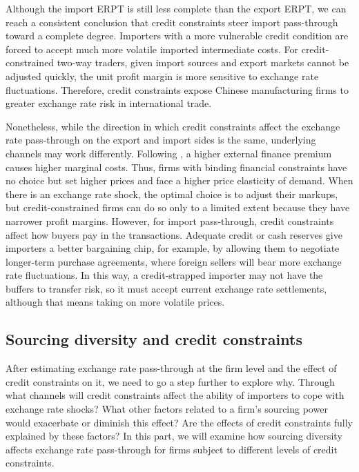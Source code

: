 \documentclass[12pt]{article}
\begin{document}
Although the import ERPT is still less complete than the export ERPT, we can reach a consistent conclusion that credit constraints steer import pass-through toward a complete degree.  Importers with a more vulnerable credit condition are forced to accept much more volatile imported intermediate costs. For credit-constrained two-way traders, given import sources and export markets cannot be adjusted quickly, the unit profit margin is more sensitive to exchange rate fluctuations. Therefore, credit constraints expose Chinese manufacturing firms to greater exchange rate risk in international trade.

Nonetheless, while the direction in which credit constraints affect the exchange rate pass-through on the export and import sides is the same, underlying channels may work differently. Following \cite{strasser2013}, a higher external finance premium causes higher marginal costs. Thus, firms with binding financial constraints have no choice but set higher prices and face a higher price elasticity of demand. When there is an exchange rate shock, the optimal choice is to adjust their markups, but credit-constrained firms can do so only to a limited extent because they have narrower profit margins. However, for import pass-through, credit constraints affect how buyers pay in the transactions. Adequate credit or cash reserves give importers a better bargaining chip, for example, by allowing them to negotiate longer-term purchase agreements, where foreign sellers will bear more exchange rate fluctuations. In this way, a credit-strapped importer may not have the buffers to transfer risk, so it must accept current exchange rate settlements, although that means taking on more volatile prices.

\subsection{Sourcing diversity and credit constraints}

After estimating exchange rate pass-through at the firm level and the effect of credit constraints on it, we need to go a step further to explore why. Through what channels will credit constraints affect the ability of importers to cope with exchange rate shocks? What other factors related to a firm's sourcing power would exacerbate or diminish this effect? Are the effects of credit constraints fully explained by these factors? In this part, we will examine how sourcing diversity affects exchange rate pass-through for firms subject to different levels of credit constraints.
\end{document}
